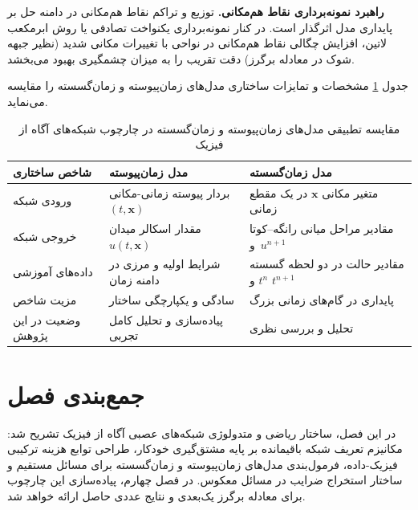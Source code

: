 \textbf{راهبرد نمونه‌برداری نقاط هم‌مکانی.} توزیع و تراکم نقاط هم‌مکانی در دامنه حل بر پایداری مدل اثرگذار است. در کنار نمونه‌برداری یکنواخت تصادفی یا روش ابرمکعب لاتین، افزایش چگالی نقاط هم‌مکانی در نواحی با تغییرات مکانی شدید (نظیر جبهه شوک در معادله برگرز) دقت تقریب را به میزان چشمگیری بهبود می‌بخشد.

جدول \ref{tab:models} مشخصات و تمایزات ساختاری مدل‌های زمان‌پیوسته و زمان‌گسسته را مقایسه می‌نماید.

\begin{table}[t]
\caption{مقایسه تطبیقی مدل‌های زمان‌پیوسته و زمان‌گسسته در چارچوب شبکه‌های آگاه از فیزیک}
\label{tab:models}
\centering
\singlespacing
\begin{tabular}{|p{2.8cm}|p{5.2cm}|p{5.6cm}|}
\hline
\textbf{شاخص ساختاری} & \textbf{مدل زمان‌پیوسته} & \textbf{مدل زمان‌گسسته} \\
\hline
ورودی شبکه & بردار پیوسته زمانی-مکانی $(t, \mathbf{x})$ & متغیر مکانی $\mathbf{x}$ در یک مقطع زمانی \\
\hline
خروجی شبکه & مقدار اسکالر میدان $u(t,\mathbf{x})$ & مقادیر مراحل میانی رانگه--کوتا و~$u^{n+1}$ \\
\hline
داده‌های آموزشی & شرایط اولیه و مرزی در دامنه زمان & مقادیر حالت در دو لحظه گسسته $t^n$ و $t^{n+1}$ \\
\hline
مزیت شاخص & سادگی و یکپارچگی ساختار & پایداری در گام‌های زمانی بزرگ \\
\hline
وضعیت در این پژوهش & پیاده‌سازی و تحلیل کامل تجربی & تحلیل و بررسی نظری \\
\hline
\end{tabular}
\end{table}

\section{جمع‌بندی فصل}
\label{sec:ch3-summary}

در این فصل، ساختار ریاضی و متدولوژی شبکه‌های عصبی آگاه از فیزیک تشریح شد: مکانیزم تعریف شبکه باقیمانده بر پایه مشتق‌گیری خودکار، طراحی توابع هزینه ترکیبی فیزیک-داده، فرمول‌بندی مدل‌های زمان‌پیوسته و زمان‌گسسته برای مسائل مستقیم و ساختار استخراج ضرایب در مسائل معکوس. در فصل چهارم، پیاده‌سازی این چارچوب برای معادله برگرز یک‌بعدی و نتایج عددی حاصل ارائه خواهد شد.
